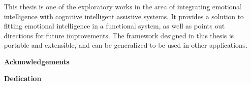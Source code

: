 This thesis is one of the exploratory works in the area of integrating emotional intelligence with cognitive intelligent assistive systems. It provides a solution to fitting emotional intelligence in a functional system, as well as points out directions for future improvements. The framework designed in this thesis is portable and extensible, and can be generalized to be used in other applications.

\cleardoublepage


\begin{center}\textbf{Acknowledgements}\end{center}

\cleardoublepage


\begin{center}\textbf{Dedication}\end{center}

\cleardoublepage

\renewcommand\contentsname{Table of Contents}
\tableofcontents
\cleardoublepage
{}

\listoftables
\cleardoublepage
{}		%

\listoffigures
\cleardoublepage
{}		%



